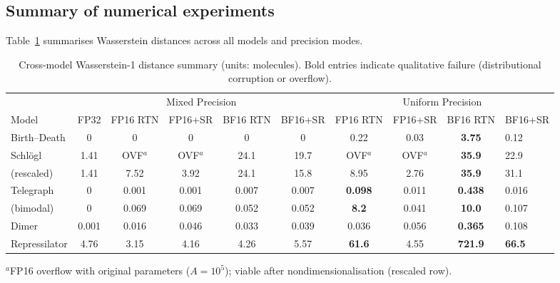 \documentclass{article}
\begin{document}
\subsection{Summary of numerical experiments}

Table~\ref{tab:summary} summarises Wasserstein distances across all models and precision modes.

\begin{table}[ht]
    \centering
    \small
    \begin{tabular}{@{}lccccccccl@{}}
        \toprule
        & \multicolumn{5}{c}{Mixed Precision} & \multicolumn{4}{c}{Uniform Precision} \\
        \cmidrule(lr){2-6} \cmidrule(lr){7-10}
        Model & FP32 & FP16 RTN & FP16+SR & BF16 RTN & BF16+SR & FP16 RTN & FP16+SR & BF16 RTN & BF16+SR \\
        \midrule
        Birth--Death & 0 & 0 & 0 & 0 & 0 & 0.22 & 0.03 & \textbf{3.75} & 0.12 \\
        Schl\"{o}gl & 1.41 & OVF$^{a}$ & OVF$^{a}$ & 24.1 & 19.7 & OVF$^{a}$ & OVF$^{a}$ & \textbf{35.9} & 22.9 \\
        \quad(rescaled) & 1.41 & 7.52 & 3.92 & 24.1 & 15.8 & 8.95 & 2.76 & \textbf{35.9} & 31.1 \\
        Telegraph & 0 & 0.001 & 0.001 & 0.007 & 0.007 & \textbf{0.098} & 0.011 & \textbf{0.438} & 0.016 \\
        \quad(bimodal) & 0 & 0.069 & 0.069 & 0.052 & 0.052 & \textbf{8.2} & 0.041 & \textbf{10.0} & 0.107 \\
        Dimer & 0.001 & 0.016 & 0.046 & 0.033 & 0.039 & 0.036 & 0.056 & \textbf{0.365} & 0.108 \\
        Repressilator & 4.76 & 3.15 & 4.16 & 4.26 & 5.57 & \textbf{61.6} & 4.55 & \textbf{721.9} & \textbf{66.5} \\
        \bottomrule
    \end{tabular}
    \par\smallskip\footnotesize $^{a}$FP16 overflow with original parameters ($A = 10^5$); viable after nondimensionalisation (rescaled row).
    \caption{Cross-model Wasserstein-1 distance summary (units: molecules). Bold entries indicate qualitative failure (distributional corruption or overflow).}
    \label{tab:summary}
\end{table}
\end{document}
